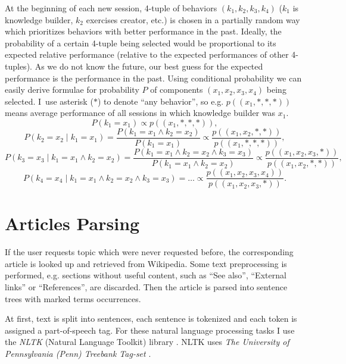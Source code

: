 \documentclass[12pt, twoside]{fithesis2}
\renewcommand{\_}{\leavevmode \kern0.07em\vbox{\hrule width0.4em}}
\begin{document}
At the beginning of each new session, 4-tuple of behaviors $(k_1, k_2, k_3, k_4)$ ($k_1$ is knowledge builder, $k_2$ exercises creator, etc.) is chosen in a partially random way
which prioritizes behaviors with better performance in the past.
Ideally, the probability of a certain 4-tuple being selected would be proportional to its expected relative performance
(relative to the expected performances of other 4-tuples).
As we do not know the future, our best guess for the expected performance is the performance in the past.
Using conditional probability we can easily derive formulae for probability $P$ of components $(x_1, x_2, x_3, x_4)$ being selected.
I~use asterisk ($*$) to denote ``any behavior'', so e.g. $p((x_1, *, *, *))$ means average performance of all sessions in which knowledge builder was $x_1$.
$$
P(k_1 = x_1) \propto p((x_1, *, *, *)),
$$
$$
P(k_2 = x_2 \mid k_1 = x_1)
  = \frac{P(k_1 = x_1 \land k_2 = x_2)}{P(k_1 = x_1)}
  \propto \frac{p((x_1, x_2, *, *))}{p((x_1, *, *, *))},
$$
$$
P(k_3 = x_3 \mid k_1 = x_1 \land k_2 = x_2)
  = \frac{P(k_1 = x_1 \land k_2 = x_2 \land k_3 = x_3)}{P(k_1 = x_1 \land k_2 = x_2)}
  \propto \frac{p((x_1, x_2, x_3, *))}{p((x_1, x_2, *, *))},
$$
$$
P(k_4 = x_4 \mid k_1 = x_1 \land k_2 = x_2 \land k_3 = x_3)
  = \ldots
  \propto \frac{p((x_1, x_2, x_3, x_4))}{p((x_1, x_2, x_3, *))}.
$$



\section{Articles Parsing}
\label{sec:articles-parsing}

If the user requests topic which were never requested before,
the corresponding article is looked up and retrieved from Wikipedia.
Some text preprocessing is performed, e.g. sections without useful content, such as ``See also'', ``External links'' or ``References'', are discarded.
Then the article is parsed into sentence trees with marked terms occurrences.

At first, text is split into sentences, each sentence is tokenized
and each token is assigned a part-of-speech tag.
    For these natural language processing tasks I use the \textit{NLTK} (Natural Language Toolkit) library \cite{nlp-python}. NLTK uses \textit{The University of Pennsylvania (Penn) Treebank Tag-set} \cite{penn-tagset}.
\end{document}
